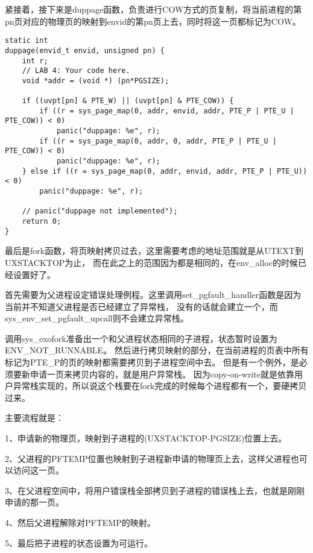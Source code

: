 \documentclass[12pt,a4paper]{article}
\begin{document}
紧接着，接下来是duppage函数，负责进行COW方式的页复制，将当前进程的第pn页对应的物理页的映射到envid的第pn页上去，同时将这一页都标记为COW。

\begin{lstlisting}[style=CPP]
static int
duppage(envid_t envid, unsigned pn) {
    int r;
    // LAB 4: Your code here.
    void *addr = (void *) (pn*PGSIZE);

    if ((uvpt[pn] & PTE_W) || (uvpt[pn] & PTE_COW)) {
        if ((r = sys_page_map(0, addr, envid, addr, PTE_P | PTE_U | PTE_COW)) < 0)
            panic("duppage: %e", r);
        if ((r = sys_page_map(0, addr, 0, addr, PTE_P | PTE_U | PTE_COW)) < 0)
            panic("duppage: %e", r);
    } else if ((r = sys_page_map(0, addr, envid, addr, PTE_P | PTE_U)) < 0)
        panic("duppage: %e", r);

    // panic("duppage not implemented");
    return 0;
}
\end{lstlisting}


最后是fork函数，将页映射拷贝过去，这里需要考虑的地址范围就是从UTEXT到UXSTACKTOP为止，
而在此之上的范围因为都是相同的，在env\_alloc的时候已经设置好了。       

首先需要为父进程设定错误处理例程。这里调用set\_pgfault\_handler函数是因为当前并不知道父进程是否已经建立了异常栈，
没有的话就会建立一个，而sys\_env\_set\_pgfault\_upcall则不会建立异常栈。 

调用sys\_exofork准备出一个和父进程状态相同的子进程，状态暂时设置为ENV\_NOT\_RUNNABLE。
然后进行拷贝映射的部分，在当前进程的页表中所有标记为PTE\_P的页的映射都需要拷贝到子进程空间中去。
但是有一个例外，是必须要新申请一页来拷贝内容的，就是用户异常栈。
因为copy-on-write就是依靠用户异常栈实现的，所以说这个栈要在fork完成的时候每个进程都有一个，要硬拷贝过来。 

主要流程就是： 

1、申请新的物理页，映射到子进程的(UXSTACKTOP-PGSIZE)位置上去。 

2、父进程的PFTEMP位置也映射到子进程新申请的物理页上去，这样父进程也可以访问这一页。 

3、在父进程空间中，将用户错误栈全部拷贝到子进程的错误栈上去，也就是刚刚申请的那一页。 

4、然后父进程解除对PFTEMP的映射。 

5、最后把子进程的状态设置为可运行。
\end{document}
